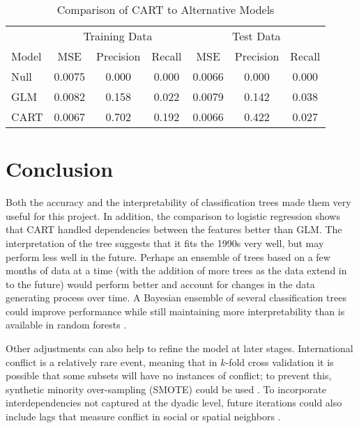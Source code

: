 \documentclass[12pt,letterpaper]{article} %
\begin{document}
\begin{table}
	\caption{Comparison of CART to Alternative Models}
	\label{cart-perf}
  \begin{center}
  \begin{tabular}{l|ccc|ccc}
   \multicolumn{1}{c}{} & \multicolumn{3}{c}{Training Data} & \multicolumn{3}{c}{Test Data} \\
  Model & MSE & Precision & Recall & MSE & Precision & Recall \\
  \midrule
  Null & 0.0075 & 0.000 & 0.000 & 0.0066 & 0.000 & 0.000 \\
  GLM & 0.0082 & 0.158 & 0.022  & 0.0079 & 0.142 & 0.038 \\
  CART & 0.0067 & 0.702 & 0.192 & 0.0066 & 0.422 & 0.027 
  \end{tabular}
  \end{center}
\end{table}




\section{Conclusion}

Both the accuracy and the interpretability of classification trees made them very useful for this project. In addition, the comparison to logistic regression shows that CART handled dependencies between the features better than GLM. The interpretation of the tree suggests that it fits the 1990s very well, but may perform less well in the future. Perhaps an ensemble of trees based on a few months of data at a time (with the addition of more trees as the data extend in to the future) would perform better and account for changes in the data generating process over time. A Bayesian ensemble of several classification trees could improve performance while still maintaining more interpretability than is available in random forests \citep{arva2013improving,montgomery2012improving,Raftery:1995,raftery2005using}.

Other adjustments can also help to refine the model at later stages. International conflict is a relatively rare event, meaning that in $k$-fold cross validation it is possible that some subsets will have no instances of conflict; to prevent this, synthetic minority over-sampling (SMOTE) could be used \citep{chawla2002smote}. To incorporate interdependencies not captured at the dyadic level, future iterations could also include lags that measure conflict in social or spatial neighbors \citep{gleditsch2000war,gleditsch2001measuring,hoff2004modeling,ward1998democratizing,ward2007disputes,ward2011network}.
\end{document}
